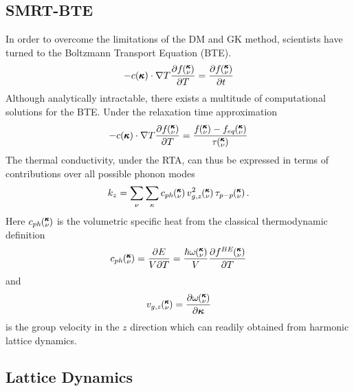 \subsection{SMRT-BTE}
%
In order to overcome the limitations of the DM and GK method, scientists have turned to the Boltzmann Transport Equation (BTE).\cite{srivastava1990physics} 
%
\begin{equation}\label{EQ:BTE}
-c(\pmb{\kappa})\cdot \nabla T\frac{\partial f\mspace{-4.0mu}\left(\mspace{-8.0mu} \begin{smallmatrix}&\pmb{\kappa} \\&\nu\end{smallmatrix} \mspace{-3.0mu}\right)}{\partial T}=\frac{\partial f\mspace{-4.0mu}\left(\mspace{-8.0mu} \begin{smallmatrix}&\pmb{\kappa} \\&\nu\end{smallmatrix} \mspace{-3.0mu}\right)}{\partial t}
\end{equation}
%
Although analytically intractable, there exists a multitude of computational solutions for the BTE. Under the relaxation time approximation
%
\begin{equation}\label{EQ:BTE_lin}
-c(\pmb{\kappa})\cdot \nabla T\frac{\partial f\kv}{\partial T}=\frac{f\kv-f_{eq}\kv}{\tau \kv}
\end{equation}
%
The thermal conductivity, under the RTA, can thus be expressed in terms of contributions over all possible phonon modes \cite{srivastava1990physics}
%
\begin{equation}\label{EQ:k_RTA}
	k_{z}= \sum_\nu\sum_\kappa c_{ph}\kv v^2_{g,z}\kv\tau_{p-p}\kv.
\end{equation}
%
Here $c_{ph}\mspace{-4.0mu}\left(\mspace{-8.0mu} \begin{smallmatrix}&\pmb{\kappa} \\&\nu\end{smallmatrix} \mspace{-3.0mu}\right)$ is the volumetric specific heat from the classical thermodynamic definition
%
\begin{equation}\label{EQ:Cph}
c_{ph}\kv=\frac{\partial E}{V\partial T}=\frac{\hbar\omega\kv}{V}\frac{\partial f^{BE}\kv}{\partial T}	
\end{equation}
%
and
\begin{equation}\label{EQ:Vg}
v_{g,z}\mspace{-4.0mu}\left(\mspace{-8.0mu} \begin{smallmatrix}&\pmb{\kappa} \\&\nu\end{smallmatrix} \mspace{-3.0mu}\right)=\frac{\partial \omega\mspace{-4.0mu}\left(\mspace{-8.0mu} \begin{smallmatrix}&\pmb{\kappa} \\&\nu\end{smallmatrix} \mspace{-3.0mu}\right)}{\partial \bm{\kappa}}
\end{equation}
is the group velocity in the $z$ direction which can readily obtained from harmonic lattice dynamics. 

\subsection{Lattice Dynamics}

